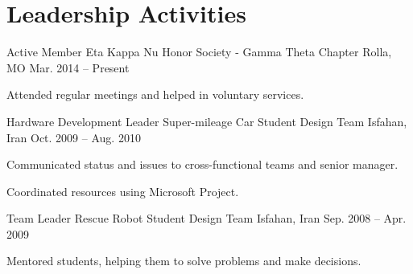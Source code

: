 \section{Leadership Activities}
\begin{cventries}
  \cventry
    {Active Member}
    {Eta Kappa Nu Honor Society - Gamma Theta Chapter}
    {Rolla, MO}
    {Mar. 2014 -- Present}
    {
      \begin{cvitems}
        \item Attended regular meetings and helped in voluntary services.
      \end{cvitems}
    }
  \cventry
    {Hardware Development Leader}
    {Super-mileage Car Student Design Team}
    {Isfahan, Iran}
    {Oct. 2009 -- Aug. 2010}
    {
      \begin{cvitems}
        \item Communicated status and issues to cross-functional teams and senior manager.
        \item Coordinated resources using Microsoft Project.
      \end{cvitems}
    }
  \cventry
    {Team Leader}
    {Rescue Robot Student Design Team}
    {Isfahan, Iran}
    {Sep. 2008 -- Apr. 2009}
    {
      \begin{cvitems}
        \item Mentored students, helping them to solve problems and make decisions.
      \end{cvitems}
    }
\end{cventries} 